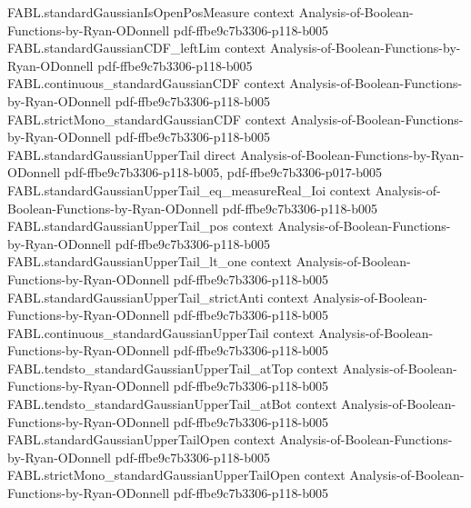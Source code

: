 \begin{theorem}
\label{FABL.tendsto_sqrt_two_mul_log_inv_standardGaussianUpperTail_div}
\leanok
{}
\proofstep
  {FABL.standardGaussianIsOpenPosMeasure}
  {context}
  {Analysis-of-Boolean-Functions-by-Ryan-ODonnell}
  {pdf-ffbe9c7b3306-p118-b005}
\proofstep
  {FABL.standardGaussianCDF_leftLim}
  {context}
  {Analysis-of-Boolean-Functions-by-Ryan-ODonnell}
  {pdf-ffbe9c7b3306-p118-b005}
\proofstep
  {FABL.continuous_standardGaussianCDF}
  {context}
  {Analysis-of-Boolean-Functions-by-Ryan-ODonnell}
  {pdf-ffbe9c7b3306-p118-b005}
\proofstep
  {FABL.strictMono_standardGaussianCDF}
  {context}
  {Analysis-of-Boolean-Functions-by-Ryan-ODonnell}
  {pdf-ffbe9c7b3306-p118-b005}
\proofstep
  {FABL.standardGaussianUpperTail}
  {direct}
  {Analysis-of-Boolean-Functions-by-Ryan-ODonnell}
  {pdf-ffbe9c7b3306-p118-b005,
    pdf-ffbe9c7b3306-p017-b005}
\proofstep
  {FABL.standardGaussianUpperTail_eq_measureReal_Ioi}
  {context}
  {Analysis-of-Boolean-Functions-by-Ryan-ODonnell}
  {pdf-ffbe9c7b3306-p118-b005}
\proofstep
  {FABL.standardGaussianUpperTail_pos}
  {context}
  {Analysis-of-Boolean-Functions-by-Ryan-ODonnell}
  {pdf-ffbe9c7b3306-p118-b005}
\proofstep
  {FABL.standardGaussianUpperTail_lt_one}
  {context}
  {Analysis-of-Boolean-Functions-by-Ryan-ODonnell}
  {pdf-ffbe9c7b3306-p118-b005}
\proofstep
  {FABL.standardGaussianUpperTail_strictAnti}
  {context}
  {Analysis-of-Boolean-Functions-by-Ryan-ODonnell}
  {pdf-ffbe9c7b3306-p118-b005}
\proofstep
  {FABL.continuous_standardGaussianUpperTail}
  {context}
  {Analysis-of-Boolean-Functions-by-Ryan-ODonnell}
  {pdf-ffbe9c7b3306-p118-b005}
\proofstep
  {FABL.tendsto_standardGaussianUpperTail_atTop}
  {context}
  {Analysis-of-Boolean-Functions-by-Ryan-ODonnell}
  {pdf-ffbe9c7b3306-p118-b005}
\proofstep
  {FABL.tendsto_standardGaussianUpperTail_atBot}
  {context}
  {Analysis-of-Boolean-Functions-by-Ryan-ODonnell}
  {pdf-ffbe9c7b3306-p118-b005}
\proofstep
  {FABL.standardGaussianUpperTailOpen}
  {context}
  {Analysis-of-Boolean-Functions-by-Ryan-ODonnell}
  {pdf-ffbe9c7b3306-p118-b005}
\proofstep
  {FABL.strictMono_standardGaussianUpperTailOpen}
  {context}
  {Analysis-of-Boolean-Functions-by-Ryan-ODonnell}
  {pdf-ffbe9c7b3306-p118-b005}

\end{theorem}
